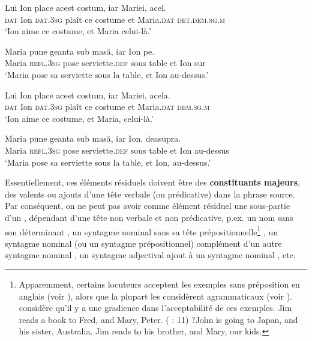 \ea
\ea 
\gll *Lui  Ion    place  acest  costum,  iar  Mariei,  acel. \label{ch2:ex117a}\\
\textsc{dat} Ion \textsc{dat.3sg}  plaît  ce  costume  et  Maria.\textsc{dat} \textsc{det.dem.sg.m}\\
\glt  ‘Ion aime ce costume, et Maria celui-là.’       

\ex  
\gll *Maria    pune  geanta  sub  masă,  iar  Ion  pe. \label{ch2:ex117b}\\ 
Maria  \textsc{refl.3sg} pose  serviette.\textsc{def}  sous  table  et  Ion  sur\\
\glt ‘Maria pose sa serviette sous la table, et Ion au-dessus.’
\z
\z


\ea
\ea 
\gll Lui  Ion    place  acest  costum,  iar  Mariei,  acela. \label{ch2:ex118a}\\
\textsc{dat}  Ion \textsc{dat.3sg}  plaît  ce  costume  et  Maria.\textsc{dat} \textsc{dem.sg.m}\\
\glt  ‘Ion aime ce costume, et Maria, celui-là.’       

\ex  
\gll Maria    pune  geanta  sub  masă,  iar  Ion,  deasupra. \label{ch2:ex118b}\\
Maria  \textsc{refl.3sg} pose  serviette.\textsc{def}  sous  table  et  Ion  au-dessus\\
\glt  ‘Maria pose sa serviette sous la table, et Ion, au-dessus.’
\z
\z

Essentiellement, ces éléments résiduels doivent être des \textbf{constituants majeurs}, {\cad} des valents ou ajouts d’une tête verbale (ou prédicative) dans la phrase source. Par conséquent, on ne peut pas avoir comme élément résiduel une sous-partie d’un  \citep{Hankamer1971,Hankamer1973,Neijt1979,Gardent1991,Hartmann2000}, dépendant d’une tête non verbale et non prédicative, p.ex. un nom sans son déterminant , un syntagme nominal sans sa tête prépositionnelle\footnote{
 Apparemment, certains locuteurs acceptent les exemples sans préposition en anglais (voir \citealt{CulicoverEtAl2005}), alors que la plupart les considèrent agrammaticaux (voir \citealt{Gardent1991}). \citet{Chaves2005} considère qu’il y a une gradience dans l’acceptabilité de ces exemples. 
\ea
\ea  *Jim reads a book to Fred, and Mary, Peter. (\citealt{Chaves2005} : 11) 
\ex  ?John is going to Japan, and his sister, Australia.
\ex  Jim reads to his brother, and Mary, our kids.                       
\z
\z
} , un syntagme nominal (ou un syntagme prépositionnel) complément d’un autre syntagme nominal , un syntagme adjectival ajout à un syntagme nominal , etc. 

